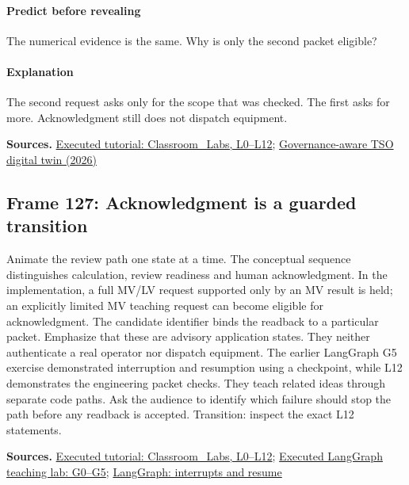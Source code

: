 \documentclass[11pt]{article}
\begin{document}
\paragraph{Predict before revealing}The numerical evidence is the same. Why is only the second packet eligible?
\paragraph{Explanation}The second request asks only for the scope that was checked. The first asks for more. Acknowledgment still does not dispatch equipment.
\par\nopagebreak\begin{minipage}{\linewidth}{\footnotesize\color{slate}\textbf{Sources.} \href{../Classroom_Labs.html}{Executed tutorial: Classroom\_Labs, L0--L12}; \href{https://arxiv.org/html/2609.22476v1}{Governance-aware TSO digital twin (2026)}\par}\end{minipage}\par\medskip
\subsection*{Frame 127: Acknowledgment is a guarded transition}
Animate the review path one state at a time. The conceptual sequence distinguishes calculation, review readiness and human acknowledgment. In the implementation, a full MV/LV request supported only by an MV result is held; an explicitly limited MV teaching request can become eligible for acknowledgment. The candidate identifier binds the readback to a particular packet. Emphasize that these are advisory application states. They neither authenticate a real operator nor dispatch equipment. The earlier LangGraph G5 exercise demonstrated interruption and resumption using a checkpoint, while L12 demonstrates the engineering packet checks. They teach related ideas through separate code paths. Ask the audience to identify which failure should stop the path before any readback is accepted. Transition: inspect the exact L12 statements.\par
\par\nopagebreak\begin{minipage}{\linewidth}{\footnotesize\color{slate}\textbf{Sources.} \href{../Classroom_Labs.html}{Executed tutorial: Classroom\_Labs, L0--L12}; \href{../Graph_Workflow_Lab.html}{Executed LangGraph teaching lab: G0--G5}; \href{https://docs.langchain.com/oss/python/langgraph/interrupts}{LangGraph: interrupts and resume}\par}\end{minipage}\par\medskip
\end{document}
